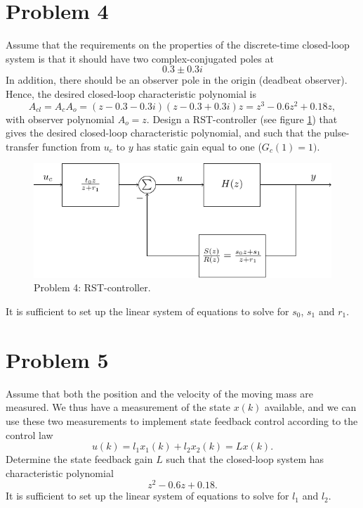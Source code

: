 \documentclass{scrartcl}
\begin{document}
\section*{Problem 4}
\label{sec-4}

Assume that the requirements on the properties of the discrete-time closed-loop system is that it should have two complex-conjugated poles at 
\begin{equation}
0.3 \pm 0.3i
\end{equation}
In addition, there should be an observer pole in the origin (deadbeat observer). Hence, the desired closed-loop characteristic polynomial is
\begin{equation}
A_{cl} = A_cA_o = (z-0.3-0.3i)(z-0.3+0.3i)z = z^3 - 0.6z^2 + 0.18z, 
\end{equation}
with observer polynomial $A_o=z$.
Design a RST-controller (see figure \ref{fig:rst}) that gives the desired closed-loop characteristic polynomial, and such that the pulse-transfer function from $u_c$ to $y$ has static gain equal to one ($G_c(1) = 1)$. 
\begin{figure}[h]
\begin{center}
\includegraphics[]{rst}
\caption{Problem 4: RST-controller.}
\label{fig:rst}
\end{center}
\end{figure}
It is sufficient to set up the linear system of equations to solve for $s_0$, $s_1$ and $r_1$.
 
\section*{Problem 5}
\label{sec-5}

Assume that both the position and the velocity of the moving mass are measured. We thus have a measurement of the state $x(k)$ available, and we can use these two measurements to implement state feedback control according to the control law
\begin{equation}
u(k) = l_1x_1(k) + l_2x_2(k) = Lx(k).
\end{equation}
Determine the state feedback gain $L$ such that the closed-loop system has characteristic polynomial
\begin{equation}
z^2 - 0.6z + 0.18.
\end{equation}
It is sufficient to set up the linear system of equations to solve for $l_1$ and $l_2$. 
 
\end{document}
